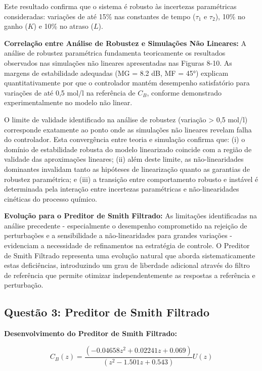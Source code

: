 \documentclass[a4paper,12pt]{article}
\begin{document}
Este resultado confirma que o sistema é robusto às incertezas paramétricas consideradas: variações de até 15\% nas constantes de tempo ($\tau_1$ e $\tau_2$), 10\% no ganho ($K$) e 10\% no atraso ($L$). 

\textbf{Correlação entre Análise de Robustez e Simulações Não Lineares:}
A análise de robustez paramétrica fundamenta teoricamente os resultados observados nas simulações não lineares apresentadas nas Figuras 8-10. As margens de estabilidade adequadas (MG = 8.2 dB, MF = 45°) explicam quantitativamente por que o controlador mantém desempenho satisfatório para variações de até 0,5 mol/l na referência de $C_B$, conforme demonstrado experimentalmente no modelo não linear.

O limite de validade identificado na análise de robustez (variação > 0,5 mol/l) corresponde exatamente ao ponto onde as simulações não lineares revelam falha do controlador. Esta convergência entre teoria e simulação confirma que: (i) o domínio de estabilidade robusta do modelo linearizado coincide com a região de validade das aproximações lineares; (ii) além deste limite, as não-linearidades dominantes invalidam tanto as hipóteses de linearização quanto as garantias de robustez paramétrica; e (iii) a transição entre comportamento robusto e instável é determinada pela interação entre incertezas paramétricas e não-linearidades cinéticas do processo químico.

\textbf{Evolução para o Preditor de Smith Filtrado:} As limitações identificadas na análise precedente - especialmente o desempenho comprometido na rejeição de perturbações e a sensibilidade a não-linearidades para grandes variações - evidenciam a necessidade de refinamentos na estratégia de controle. O Preditor de Smith Filtrado representa uma evolução natural que aborda sistematicamente estas deficiências, introduzindo um grau de liberdade adicional através do filtro de referência que permite otimizar independentemente as respostas a referência e perturbação.

\subsection{Questão 3: Preditor de Smith Filtrado}

\textbf{Desenvolvimento do Preditor de Smith Filtrado:}

\begin{equation}
C_{B}(z) = \frac{(-0.04658z^2 + 0.02241z + 0.069)}{(z^2 - 1.501z + 0.543)} U(z)
\end{equation}
\end{document}
